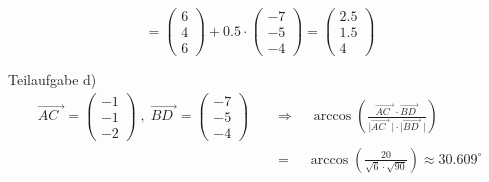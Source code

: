 \begin{exercise}
\begin{equation*}
    =
    \begin{pmatrix}
      \num{6} \\
      \num{4} \\
      \num{6}
    \end{pmatrix}
    +\num{0.5}\cdot
    \begin{pmatrix}
      -\num{7} \\
      -\num{5} \\
      -\num{4}
    \end{pmatrix}
    =
    \begin{pmatrix}
      \num{2.5} \\
      \num{1.5} \\
      \num{4}
    \end{pmatrix}
    \end{equation*}

    Teilaufgabe d)
    \begin{equation*}
    \begin{split}
    \overrightarrow{AC\;\,}=
    \begin{pmatrix}
      -\num{1} \\
      -\num{1} \\
      -\num{2}
    \end{pmatrix}
    \;,\;
    \overrightarrow{BD\;}=
    \begin{pmatrix}
      -\num{7} \\
      -\num{5} \\
      -\num{4}
    \end{pmatrix}
    \quad&\Rightarrow\quad
    \arccos\left(\frac{\overrightarrow{AC\;\,}\cdot\overrightarrow{BD\;}}{\big|\overrightarrow{AC\;\,}\,\big|\cdot\big|\overrightarrow{BD\;}\,\big|}\right)
    \\
    &=\quad\arccos\left(\frac{\num{20}}{\sqrt{\num{6}}\cdot\sqrt{\num{90}}}\right)
    \approx\num{30.609}^\circ
    \end{split}
    \end{equation*}


\end{exercise}
